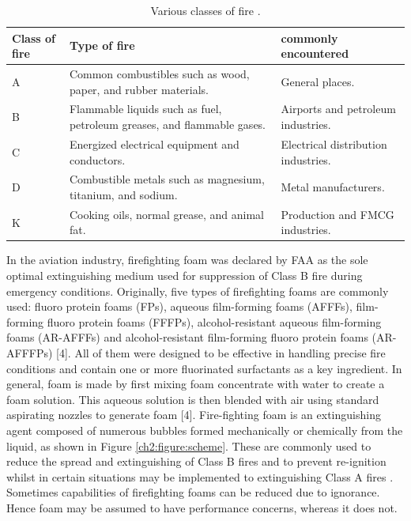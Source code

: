 \documentclass[12pt]{report}
\begin{document}
\begin{table}[H]
\centering
\caption{Various classes of fire \cite{hinnant2020characterizing}.}
\begin{tabular}{ m{} m{} m{} }
\hline
Class of fire & Type of fire & commonly encountered \\ 
\hline
A & Common combustibles such as wood, paper, and rubber materials. & General places. \\
B & Flammable liquids such as fuel, petroleum greases, and flammable gases. & Airports and petroleum industries. \\
C & Energized electrical equipment and conductors. & Electrical distribution industries. \\
D & Combustible metals such as magnesium, titanium, and sodium. & Metal manufacturers. \\ 
K & Cooking oils, normal grease, and animal fat. & Production and FMCG industries. \\
\hline
\end{tabular}
\label{ch2:table:classes}
\end{table}

In the aviation industry, firefighting foam was declared by FAA as the sole optimal extinguishing medium used for suppression of Class B fire during emergency conditions. Originally, five types of firefighting foams are commonly used: fluoro protein foams (FPs), aqueous film-forming foams (AFFFs), film-forming fluoro protein foams (FFFPs), alcohol-resistant aqueous film-forming foams (AR-AFFFs) and alcohol-resistant film-forming fluoro protein foams (AR-AFFFPs) [4]. All of them were designed to be effective in handling precise fire conditions and contain one or more fluorinated surfactants as a key ingredient.
In general, foam is made by first mixing foam concentrate with water to create a foam solution. This aqueous solution is then blended with air using standard aspirating nozzles to generate foam [4].  Fire-fighting foam is an extinguishing agent composed of numerous bubbles formed mechanically or chemically from the liquid, as shown in Figure \ref{ch2:figure:scheme}. These are commonly used to reduce the spread and extinguishing of Class B fires and to prevent re-ignition whilst in certain situations may be implemented to extinguishing Class A fires \cite{oguike2013study}. Sometimes capabilities of firefighting foams can be reduced due to ignorance. Hence foam may be assumed to have performance concerns, whereas it does not. 
\end{document}
